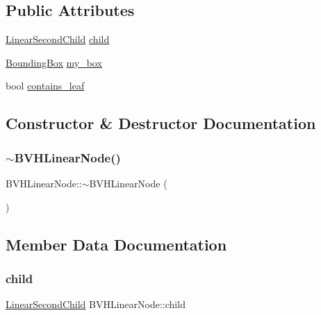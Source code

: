 \subsection*{Public Attributes}
\begin{DoxyCompactItemize}
\item 
\mbox{\hyperlink{unionBVHLinearNode_1_1LinearSecondChild}{Linear\+Second\+Child}} \mbox{\hyperlink{structBVHLinearNode_a6fae5bebf63bfa365e1fab04e96e9146}{child}}
\item 
\mbox{\hyperlink{classBoundingBox}{Bounding\+Box}} \mbox{\hyperlink{structBVHLinearNode_abd02379045550966cdc50a20ea877fa5}{my\+\_\+box}}
\item 
bool \mbox{\hyperlink{structBVHLinearNode_aabfe3d3f0fa2893fbaa60629baea3cda}{contains\+\_\+leaf}}
\end{DoxyCompactItemize}


\subsection{Constructor \& Destructor Documentation}
\mbox{\label{structBVHLinearNode_ab0e9e423108e944c8c7c5ab6a35aa615}} 
\subsubsection{\texorpdfstring{$\sim$BVHLinearNode()}{~BVHLinearNode()}}
{\footnotesize\ttfamily B\+V\+H\+Linear\+Node\+::$\sim$\+B\+V\+H\+Linear\+Node (\begin{DoxyParamCaption}{ }\end{DoxyParamCaption})\hspace{0.3cm}{\ttfamily [default]}}



\subsection{Member Data Documentation}
\mbox{\label{structBVHLinearNode_a6fae5bebf63bfa365e1fab04e96e9146}} 
\subsubsection{\texorpdfstring{child}{child}}
{\footnotesize\ttfamily \mbox{\hyperlink{unionBVHLinearNode_1_1LinearSecondChild}{Linear\+Second\+Child}} B\+V\+H\+Linear\+Node\+::child}

